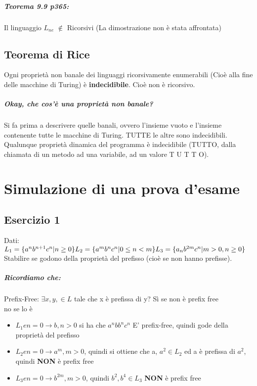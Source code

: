 \documentclass[12pt, a4paper, openany, oneside]{book}
\begin{document}
\paragraph{Teorema 9.9 p365:} Il linguaggio $L_{ne}$ $\notin$ Ricorsivi (La dimostrazione
non è stata affrontata)
\section{Teorema di Rice}
Ogni proprietà non banale dei linguaggi ricorsivamente enumerabili (Cioè alla fine
delle macchine di Turing) è \textbf{indecidibile}. Cioè non è ricorsivo.
\paragraph{Okay, che cos'è una proprietà non banale? }Si fa prima a descrivere
quelle banali, ovvero l'insieme vuoto e l'insieme contenente tutte le macchine
di Turing. TUTTE le altre sono indecidibili. Qualunque proprietà dinamica del 
programma è indecidibile (TUTTO, dalla chiamata di un metodo ad una variabile, 
ad un valore T U T T O). 
\chapter{Simulazione di una prova d'esame} 
\section{Esercizio 1}
Dati:\\
$L_{1} = \{a^{n}b^{n+1}c^{n}| n \geq 0\}\\
L_{2} = \{a^{m}b^{n}c^{n} | 0 \leq n < m\}\\
L_{3} = \{a_{n}b^{2m}c^{n} | m > 0, n \geq 0\}$
Stabilire se godono della proprietà del prefisso (cioè se non hanno prefisse).
\paragraph{Ricordiamo che:} Prefix-Free: $\exists x, y, \in L$ tale che x è prefissa 
di y? Sì se non è prefix free\\
no se lo è\\
\begin{itemize}
	\item $L_{1} e n = 0 \to b, n > 0$ si ha che $a^{n}bb^{n}c^{n}$ E' prefix-free, 
	quindi gode della proprietà del prefisso
	\item $L_{2} e n = 0 \to a^{m}, m > 0$, quindi si ottiene che a, $a^{2} \in L_{2}$ ed
	a è prefissa di $a^{2}$, quindi \textbf{NON} è prefix free
	\item $L_{3} e n = 0 \to b^{2m}, m > 0$, quindi $b^{2}, b^{4} \in L_{3}$ \textbf{NON} è
	prefix free
\end{itemize}
\end{document}
